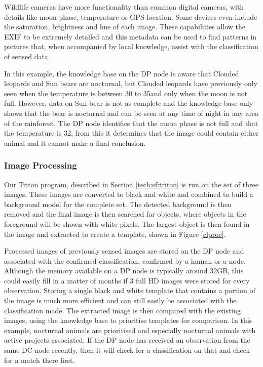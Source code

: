 			Wildlife cameras have more functionality than common digital cameras, with details like moon phase, temperature or GPS location. Some devices even include the saturation, brightness and hue of each image. These capabilities allow the EXIF to be extremely detailed and this metadata can be used to find patterns in pictures that, when accompanied by local knowledge, assist with the classification of sensed data. 
			
			In this example, the knowledge base on the DP node is aware that Clouded leopards and Sun bears are nocturnal, but Clouded leopards have previously only seen when the temperature is between 30 to 35\celsius and only when the moon is not full. However, data on Sun bear is not as complete and the knowledge base only shows that the bear is nocturnal and can be seen at any time of night in any area of the rainforest. The DP node identifies that the moon phase is not full and that the temperature is 32\celsius, from this it determines that the image could contain either animal and it cannot make a final conclusion.
			
		\subsubsection{Image Processing}
			Our Triton program, described in Section \ref{tech:sf:triton} is run on the set of three images. These images are converted to black and white and combined to build a background model for the complete set. The detected background is then removed and the final image is then searched for objects, where objects in the foreground will be shown with white pixels. The largest object is then found in the image and extracted to create a template, shown in Figure \ref{clproc}.
			
			Processed images of previously sensed images are stored on the DP node and associated with the confirmed classification, confirmed by a human or a node. Although the memory available on a DP node is typically around 32GB, this could easily fill in a matter of months if 3 full HD images were stored for every observation. Storing a single black and white template that contains a portion of the image is much more efficient and can still easily be associated with the classification made. The extracted image is then compared with the existing images, using the knowledge base to prioritise templates for comparison. In this example, nocturnal animals are prioritised and especially nocturnal animals with active projects associated. If the DP node has received an observation from the same DC node recently, then it will check for a classification on that and check for a match there first.
			
